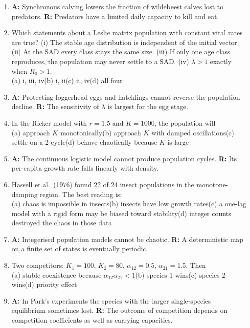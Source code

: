 \begin{enumerate}[label=\textbf{Q\arabic*.},leftmargin=2.6em]
\item \textbf{A:} Synchronous calving lowers the fraction of wildebeest calves lost to predators. \textbf{R:} Predators have a
limited daily capacity to kill and eat.
\item Which statements about a Leslie matrix population with constant vital rates are true? (i) The stable age distribution
is independent of the initial vector. (ii) At the SAD every class stays the same size. (iii) If only one age class
reproduces, the population may never settle to a SAD. (iv) $\lambda>1$ exactly when $R_0>1$.\\
(a) i, iii, iv\quad (b) i, ii\quad (c) ii, iv\quad (d) all four
\item \textbf{A:} Protecting loggerhead eggs and hatchlings cannot reverse the population decline. \textbf{R:} The sensitivity of
$\lambda$ is largest for the egg stage.
\item In the Ricker model with $r=1.5$ and $K=1000$, the population will\\
(a) approach $K$ monotonically\quad (b) approach $K$ with damped oscillations\quad (c) settle on a 2-cycle\quad (d) behave
chaotically because $K$ is large
\item \textbf{A:} The continuous logistic model cannot produce population cycles. \textbf{R:} Its per-capita growth rate falls
linearly with density.
\item Hassell et al.\ (1976) found 22 of 24 insect populations in the monotone-damping region. The best reading is:\\
(a) chaos is impossible in insects\quad (b) insects have low growth rates\quad (c) a one-lag model with a rigid form may be
biased toward stability\quad (d) integer counts destroyed the chaos in those data
\item \textbf{A:} Integerised population models cannot be chaotic. \textbf{R:} A deterministic map on a finite set of states is
eventually periodic.
\item Two competitors: $K_1=100$, $K_2=80$, $\alpha_{12}=0.5$, $\alpha_{21}=1.5$. Then\\
(a) stable coexistence because $\alpha_{12}\alpha_{21}<1$\quad (b) species 1 wins\quad (c) species 2 wins\quad (d) priority
effect
\item \textbf{A:} In Park's experiments the species with the larger single-species equilibrium sometimes lost. \textbf{R:} The
outcome of competition depends on competition coefficients as well as carrying capacities.

\end{enumerate}

